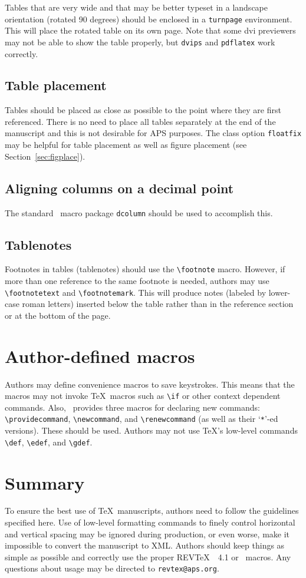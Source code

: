 \documentclass[twocolumn,secnumarabic,amssymb, nobibnotes, aps, prd]{revtex4-1}
\newcommand{\revtex}{REV\TeX\ }
\newcommand{\classoption}[1]{\texttt{#1}}
\newcommand{\macro}[1]{\texttt{\textbackslash#1}}
\newcommand{\m}[1]{\macro{#1}}
\newcommand{\env}[1]{\texttt{#1}}
\begin{document}
Tables that are very wide and that may be better typeset in a
landscape orientation (rotated 90 degrees) should be enclosed in a
\env{turnpage} environment. This will place the rotated table on its own
page. Note that some dvi previewers may not be able to show the table
properly, but \texttt{dvips} and \texttt{pdflatex} work correctly.

\subsection{Table placement}
Tables should be placed as close as possible to the point where they
are first referenced. There is no need to place all tables separately
at the end of the manuscript and this is not desirable for APS
purposes. The class option \classoption{floatfix} may be helpful for
table placement as well as figure placement (see Section~\ref{sec:figplace}).

\subsection{Aligning columns on a decimal point}
The standard \LaTeXe\ macro package \classoption{dcolumn} should be
used to accomplish this.

\subsection{Tablenotes}
\label{sec:tablenotes}
Footnotes in tables (tablenotes) should use the \m{footnote}
macro. However, if more than one reference to the same footnote is
needed, authors may use \m{footnotetext} and \m{footnotemark}. This
will produce notes (labeled by lower-case roman letters) inserted
below the table rather than in the reference section or at the bottom
of the page.


\section{Author-defined macros}
Authors may define convenience macros to save keystrokes. This means
that the macros may not invoke \TeX\ macros such as \m{if} or other
context dependent commands. Also, \LaTeXe\ provides three macros for
declaring new commands: \m{providecommand}, \m{newcommand}, and
\m{renewcommand} (as well as their `\verb+*+'-ed versions). These
should be used. Authors may not use \TeX\relax's low-level commands
\m{def}, \m{edef}, and \m{gdef}.

\section{Summary}
To ensure the best use of \TeX\ manuscripts, authors need to follow
the guidelines specified here. Use of low-level formatting commands to
finely control horizontal and vertical spacing may be ignored during
production, or even worse, make it impossible to convert the
manuscript to XML. Authors should keep
things as simple as possible and correctly use the proper \revtex~4.1
or \LaTeXe\ macros. Any questions about usage may be directed to
\texttt{revtex@aps.org}.
\end{document}
